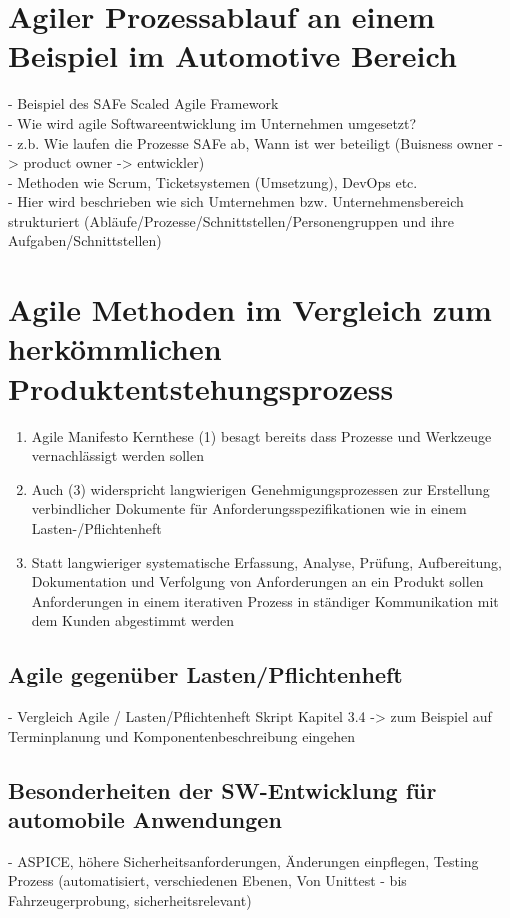 \section{Agiler Prozessablauf an einem Beispiel im Automotive Bereich}
- Beispiel des SAFe Scaled Agile Framework\\ 
- Wie wird agile Softwareentwicklung im Unternehmen umgesetzt? \\
- z.b. Wie laufen die Prozesse SAFe ab, Wann ist wer beteiligt (Buisness owner -> product owner -> entwickler)\\
- Methoden wie Scrum, Ticketsystemen (Umsetzung), DevOps etc. \\ 
- Hier wird beschrieben wie sich Umternehmen bzw. Unternehmensbereich strukturiert (Abläufe/Prozesse/Schnittstellen/Personengruppen und ihre Aufgaben/Schnittstellen) \\ 
 
\section{Agile Methoden im Vergleich zum herkömmlichen Produktentstehungsprozess}\label{vergleich}

\begin{enumerate}
	\item Agile Manifesto Kernthese (1) besagt bereits dass Prozesse und Werkzeuge vernachlässigt werden sollen
	\item Auch (3) widerspricht langwierigen Genehmigungsprozessen zur Erstellung verbindlicher Dokumente für Anforderungsspezifikationen wie in einem Lasten-/Pflichtenheft
	\item Statt langwieriger \glqq systematische Erfassung, Analyse, 
	Prüfung, Aufbereitung, Dokumentation und Verfolgung von Anforderungen an ein Produkt\grqq{} \cite{Daberkow2022} sollen Anforderungen in einem iterativen Prozess in ständiger Kommunikation mit dem Kunden abgestimmt werden
\end{enumerate}

 \subsection{Agile gegenüber Lasten/Pflichtenheft}
 - Vergleich Agile / Lasten/Pflichtenheft Skript Kapitel 3.4 -> zum Beispiel auf Terminplanung und Komponentenbeschreibung eingehen\\


 

 \subsection{Besonderheiten der SW-Entwicklung für automobile Anwendungen}
 - ASPICE, höhere Sicherheitsanforderungen, Änderungen einpflegen, Testing Prozess (automatisiert, verschiedenen Ebenen, Von Unittest - bis Fahrzeugerprobung, sicherheitsrelevant)\\

